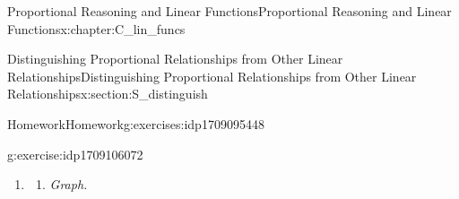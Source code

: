 \documentclass[oneside,10pt,]{book}
\newcommand{\tabularfont}{\relax}
\newlength{\fillinmaxwidth}
\newlength{\fillincontract}
\newlength{\fillinheight}
\newcommand{\fillintext}[1]{%
\setlength{\fillinmaxwidth}{#1em*\real{0.5}}%
\setlength{\fillincontract}{#1em*\real{0.5}*\real{0.2}}%
\setlength{\fillinheight}{\heightof{\strut}+1.2pt}%
\strut\nobreak\leaders\vbox{\hrule width 0.3pt height 0.3pt \vskip -1.2pt}\hskip 1\fillinmaxwidth minus \fillincontract\nobreak\strut%
}
\newcommand{\lititle}[1]{{\slshape#1}}
\numberwithin{equation}{chapter}
\newcommand{\hrulethin}  {\noalign{\hrule height 0.04em}}
\begin{document}
\begin{chapterptx}{Proportional Reasoning and Linear Functions}{}{Proportional Reasoning and Linear Functions}{}{}{x:chapter:C_lin_funcs}
\begin{sectionptx}{Distinguishing Proportional Relationships from Other Linear Relationships}{}{Distinguishing Proportional Relationships from Other Linear Relationships}{}{}{x:section:S_distinguish}
\begin{exercises-subsection}{Homework}{}{Homework}{}{}{g:exercises:idp1709095448}
\begin{divisionexercise}{3}{}{}{g:exercise:idp1709106072}
\begin{enumerate}[font=\bfseries,label=(\alph*),ref=\alph*]
\item\label{x:task:exer-story-bananas}\begin{enumerate}[font=\bfseries,label=(\roman*),ref=\theenumi.\roman*]
\item{}\lititle{Graph.}\par%
\begin{image}{0.2}{0.6}{0.2}%

\end{image}
\end{enumerate}
\end{enumerate}
\end{divisionexercise}
\end{exercises-subsection}
\end{sectionptx}
\end{chapterptx}
\end{document}
